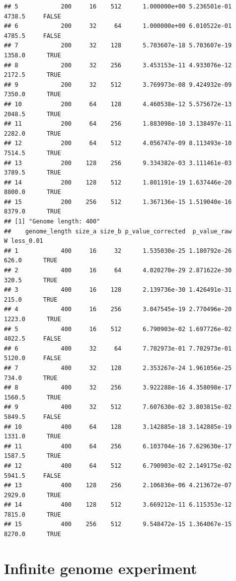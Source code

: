 \documentclass[]{book}
\begin{document}
\begin{verbatim}
## 5            200     16    512      1.000000e+00 5.236501e-01 4738.5     FALSE
## 6            200     32     64      1.000000e+00 6.010522e-01 4785.5     FALSE
## 7            200     32    128      5.703607e-18 5.703607e-19 1358.0      TRUE
## 8            200     32    256      3.453153e-11 4.933076e-12 2172.5      TRUE
## 9            200     32    512      3.769973e-08 9.424932e-09 7350.0      TRUE
## 10           200     64    128      4.460538e-12 5.575672e-13 2048.5      TRUE
## 11           200     64    256      1.883098e-10 3.138497e-11 2282.0      TRUE
## 12           200     64    512      4.056747e-09 8.113493e-10 7514.5      TRUE
## 13           200    128    256      9.334382e-03 3.111461e-03 3789.5      TRUE
## 14           200    128    512      1.801191e-19 1.637446e-20 8800.0      TRUE
## 15           200    256    512      1.367136e-15 1.519040e-16 8379.0      TRUE
## [1] "Genome length: 400"
##    genome_length size_a size_b p_value_corrected  p_value_raw      W less_0.01
## 1            400     16     32      1.535030e-25 1.180792e-26  626.0      TRUE
## 2            400     16     64      4.020270e-29 2.871622e-30  320.5      TRUE
## 3            400     16    128      2.139736e-30 1.426491e-31  215.0      TRUE
## 4            400     16    256      3.047545e-19 2.770496e-20 1223.0      TRUE
## 5            400     16    512      6.790903e-02 1.697726e-02 4022.5     FALSE
## 6            400     32     64      7.702973e-01 7.702973e-01 5120.0     FALSE
## 7            400     32    128      2.353267e-24 1.961056e-25  734.0      TRUE
## 8            400     32    256      3.922288e-16 4.358098e-17 1560.5      TRUE
## 9            400     32    512      7.607630e-02 3.803815e-02 5849.5     FALSE
## 10           400     64    128      3.142885e-18 3.142885e-19 1331.0      TRUE
## 11           400     64    256      6.103704e-16 7.629630e-17 1587.5      TRUE
## 12           400     64    512      6.790903e-02 2.149175e-02 5941.5     FALSE
## 13           400    128    256      2.106836e-06 4.213672e-07 2929.0      TRUE
## 14           400    128    512      3.669212e-11 6.115353e-12 7815.0      TRUE
## 15           400    256    512      9.548472e-15 1.364067e-15 8270.0      TRUE
\end{verbatim}

\hypertarget{infinite-genome-experiment}{%
\chapter{Infinite genome experiment}\label{infinite-genome-experiment}}
\end{document}
